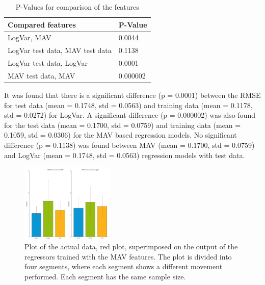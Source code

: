 	\begin{table}[!thpb]
		\begin{center}
			\begin{tabular}{l l}
				\hline
				\textbf{Compared features} & \textbf{P-Value}\\
				\hline
				LogVar, MAV & 0.0044 \\
				LogVar test data, MAV test data & 0.1138 \\
				LogVar test data, LogVar & 0.0001 \\
				MAV test data, MAV & 0.000002 \\
				\hline
			\end{tabular}
			\caption{P-Values for comparison of the features}
		\end{center}
	\end{table}
	
	It was found that there is a significant difference (p = 0.0001) between the RMSE for test data (mean = 0.1748, std = 0.0563) and training data (mean = 0.1178, std = 0.0272) for LogVar. A significant difference (p = 0.000002) was also found for the test data (mean = 0.1700, std = 0.0759) and training data (mean = 0.1059, std = 0.0306) for the MAV based regression models. No significant difference (p = 0.1138) was found between MAV (mean = 0.1700, std = 0.0759) and LogVar (mean = 0.1748, std = 0.0563) regression models with test data.
	
	\begin{figure}[!thpb]
		\centering
		\includegraphics[width=0.4\textwidth]{figures/GotItTime}  %
		\caption{Plot of the actual data, red plot, superimposed on the output of the regressors trained with the MAV features. The plot is divided into four segments, where each segment shows a different movement performed. Each segment has the same sample size.}
		\label{fig:GotItTime}  %
	\end{figure}
	
